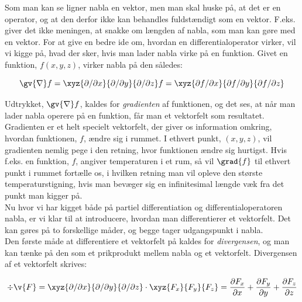 Som man kan se ligner nabla en vektor, men man skal huske på, at det er en operator, og at den derfor ikke kan behandles fuldstændigt som en vektor. F.eks. giver det ikke meningen, at snakke om længden af nabla, som man kan gøre med en vektor. For at give en bedre ide om, hvordan en differentialoperator virker, vil vi kigge på, hvad der sker, hvis man lader nabla virke på en funktion. Givet en funktion, $f(x,y,z)$, virker nabla på den således:

\begin{equation}
\gv{\nabla} f = \xyz{\partial / \partial x}{\partial / \partial y}{\partial / \partial z} f = \xyz{\partial f / \partial x}{\partial f / \partial y}{\partial f / \partial z}
\end{equation}

\vspace{2mm}

Udtrykket, $\gv{\nabla}f$, kaldes for \emph{gradienten} af funktionen, og det ses, at når man lader nabla operere på en funktion, får man et vektorfelt som resultatet. Gradienten er et helt specielt vektorfelt, der giver os information omkring, hvordan funktionen, $f$, ændre sig i rummet. I ethvert punkt, $\left( x,y,z \right)$, vil gradienten nemlig pege i den retning, hvor funktionen ændre sig hurtigst. Hvis f.eks. en funktion, $f$, angiver temperaturen i et rum, så vil $\grad{f}$ til ethvert punkt i rummet fortælle os, i hvilken retning man vil opleve den største temperaturstigning, hvis man bevæger sig en infinitesimal længde væk fra det punkt man kigger på.\\

Nu hvor vi har kigget både på partiel differentiation og differentialoperatoren nabla, er vi klar til at introducere, hvordan man differentierer et vektorfelt. Det kan gøres på to forskellige måder, og begge tager udgangspunkt i nabla.\\

Den første måde at differentiere et vektorfelt på kaldes for \emph{divergensen}, og man kan tænke på den som et prikprodukt mellem nabla og et vektorfelt. Divergensen af et vektorfelt skrives:

\begin{equation}
\div{\v{F}} = \xyz{\partial  / \partial x}{\partial  / \partial y}{\partial  / \partial z} \cdot \xyz{F_x}{F_y}{F_z}  = \frac{\partial F_x}{\partial x}+\frac{\partial F_y}{\partial y}+\frac{\partial F_z}{\partial z}
\end{equation}

\vspace{2mm}

